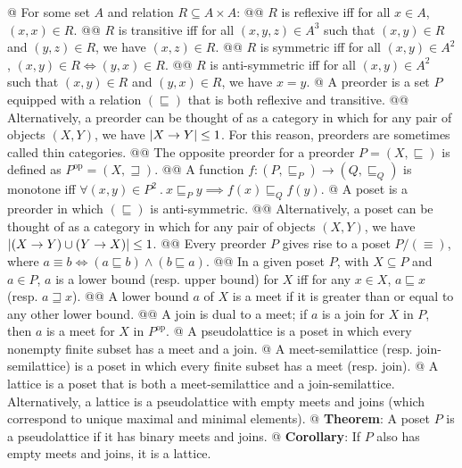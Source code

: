 \documentclass[]{article}
\DeclarePairedDelimiter{\abs}{\lvert}{\rvert}
\newcommand{\poset}[0]{\ensuremath{\mathrel{\sqsubseteq}}}
\newcommand{\tesop}[0]{\ensuremath{\mathrel{\sqsupseteq}}}
\newcommand{\opcat}[1]{{#1}^{\mathrm{op}}}
\begin{document}
\begin{easylist}[itemize]
@ For some set $A$ and relation $R \subseteq A \times A$:
@@ $R$ is \textsf{reflexive} iff for all $x \in A$, $(x, x) \in R$.
@@ {%
  $R$ is \textsf{transitive} iff for all $(x, y, z) \in A^3$ such that
  $(x, y) \in R$ and $(y, z) \in R$, we have $(x, z) \in R$.
}
@@ {%
  $R$ is \textsf{symmetric} iff for all $(x, y) \in A^2$,
  $(x, y) \in R \iff (y, x) \in R$.
}
@@ {%
  $R$ is \textsf{anti-symmetric} iff for all $(x, y) \in A^2$ such that
  $(x, y) \in R$ and $(y, x) \in R$, we have $x = y$.
}
@ {%
  A \textsf{preorder} is a set $P$ equipped with a relation $(\poset)$ that is
  both reflexive and transitive.
}
@@ {%
  Alternatively, a preorder can be thought of as a category in which for any
  pair of objects $(X, Y)$, we have $\abs{X \to Y} \le 1$. For this reason,
  preorders are sometimes called \textsf{thin categories}.
}
@@ {%
  The \textsf{opposite preorder} for a preorder $P = (X, \poset)$ is defined as
  $\opcat{P} = (X, \tesop)$.
}
@@ {%
  A function $f : (P, \poset_P) \to (Q, \poset_Q)$ is \textsf{monotone} iff
  $\forall (x, y) \in P^2 ~ . ~ x \poset_P y \implies f(x) \poset_Q f(y)$.
}
@ A \textsf{poset} is a preorder in which $(\poset)$ is anti-symmetric.
@@ {%
  Alternatively, a poset can be thought of as a category in which for any pair
  of objects $(X, Y)$, we have $\abs{(X \to Y) \cup (Y \to X)} \le 1$.
}
@@ {%
  Every preorder $P$ gives rise to a poset $P / (\equiv)$, where
  $a \equiv b \iff (a \poset b) \land (b \poset a)$.
}
@@ {%
  In a given poset $P$, with $X \subseteq P$ and $a \in P$, $a$ is a
  \textsf{lower bound} (resp. \textsf{upper bound}) for $X$ iff for any
  $x \in X$, $a \poset x$ (resp. $a \tesop x$).
}
@@ {%
  A lower bound $a$ of $X$ is a \textsf{meet} if it is greater than or equal to
  any other lower bound.
}
@@ {%
  A \textsf{join} is dual to a meet; if $a$ is a join for $X$ in $P$, then
  $a$ is a meet for $X$ in $\opcat{P}$.
}
@ {%
  A \textsf{pseudolattice} is a poset in which every nonempty finite subset has
  a meet and a join.
}
@ {%
  A \textsf{meet-semilattice} (resp. \textsf{join-semilattice}) is a poset in
  which every finite subset has a meet (resp. join).
}
@ {%
  A \textsf{lattice} is a poset that is both a meet-semilattice and a
  join-semilattice. Alternatively, a lattice is a pseudolattice with empty meets
  and joins (which correspond to unique maximal and minimal elements).
}
@ {%
  \textbf{Theorem}:
  A poset $P$ is a pseudolattice if it has binary meets and joins.
}
@ {%
  \textbf{Corollary}:
  If $P$ also has empty meets and joins, it is a lattice.
}
\end{easylist}
\end{document}

